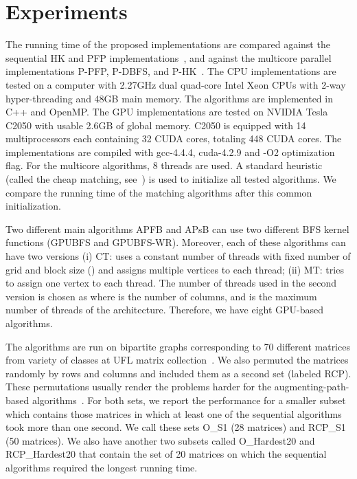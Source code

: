 \documentclass[11pt,a4paper]{article}
\newcommand{\GPUone}{GPUBFS\xspace}
\newcommand{\GPUtwo}{GPUBFS-WR\xspace}
\newcommand{\mcpf}{P-PFP\xspace}
\newcommand{\mchk}{P-HK\xspace}
\newcommand{\mcbfs}{P-DBFS\xspace}
\newcommand{\APSBFS}{APsB\xspace}
\newcommand{\APFBFS}{APFB\xspace}
\begin{document}
\section{Experiments}\label{sec:exp}
\vspace*{-1ex}
The running time of the proposed implementations are compared against the 
sequential HK and PFP implementations~\cite{duff2011design}, and
against the multicore parallel implementations 
\mcpf, \mcbfs, and \mchk~\cite{ahrbka:12}. The 
CPU implementations are tested on a computer with 2.27GHz dual quad-core Intel Xeon CPUs with 
2-way hyper-threading and 48GB main memory. The algorithms are implemented in 
C++ and OpenMP. The GPU implementations are tested
on NVIDIA Tesla C2050 with usable 2.6GB of global memory. 
C2050 is equipped with 14 multiprocessors each containing 32 CUDA cores, 
totaling 448 CUDA cores. The implementations are compiled with gcc-4.4.4, cuda-4.2.9 and -O2 optimization flag. For the multicore algorithms, 
8 threads are used.  
A standard heuristic (called the cheap matching, see~\cite{duff2011design}) is used to initialize all tested algorithms.
We compare the running
time of the matching algorithms after this common initialization.

Two different main algorithms \APFBFS and \APSBFS can use two different BFS kernel functions (\GPUone{} and \GPUtwo{}).
Moreover, each of these algorithms can have two 
versions (i) CT: uses a constant number of threads with fixed number of grid and block size
() and assigns multiple vertices to each thread; (ii) MT: tries to assign one vertex to each thread. The number
of threads used in the second version is chosen as 
where  is the number of columns, and  is the 
maximum number of threads of the architecture. 
Therefore, we have eight GPU-based algorithms.

The algorithms are run on bipartite graphs corresponding to 70 different matrices 
from variety of classes 
at UFL matrix collection~\cite{dahu:11}. 
We also permuted the matrices randomly by rows and columns and included them as a second set (labeled RCP). These permutations usually render the problems
harder for the augmenting-path-based algorithms~\cite{duff2011design}. 
For both sets, we report the performance for a smaller subset which contains those matrices in which 
at least one of the sequential algorithms took more than one second.
We call these sets O\_S1 (28 matrices) and RCP\_S1 (50 matrices). We also have another two subsets called O\_Hardest20 and
RCP\_Hardest20 that contain the set of 20 matrices on which the sequential algorithms required the longest running time.
\end{document}

